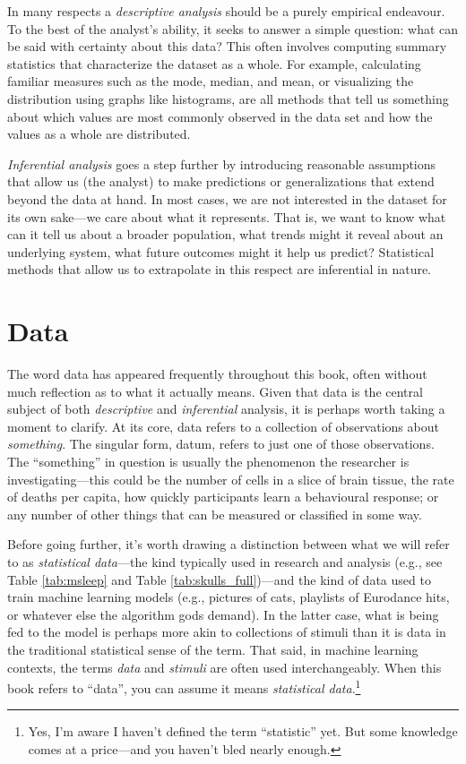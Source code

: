 In many respects a \textit{descriptive analysis} should be a purely empirical endeavour. To the best of the analyst’s ability, it seeks to answer a simple question: what can be said with certainty about this data? This often involves computing summary statistics that characterize the dataset as a whole. For example, calculating familiar measures such as the mode, median, and mean, or visualizing the distribution using graphs like histograms, are all methods that tell us something about which values are most commonly observed in the data set and how the values as a whole are distributed.

\textit{Inferential analysis} goes a step further by introducing reasonable assumptions that allow us (the analyst) to make predictions or generalizations that extend beyond the data at hand. In most cases, we are not interested in the dataset for its own sake—we care about what it represents. That is, we want to know what can it tell us about a broader population, what trends might it reveal about an underlying system, what future outcomes might it help us predict? Statistical methods that allow us to extrapolate in this respect are inferential in nature.

\section{Data}

The word data has appeared frequently throughout this book, often without much reflection as to what it actually means. Given that data is the central subject of both \textit{descriptive} and \textit{inferential} analysis, it is perhaps worth taking a moment to clarify. At its core, \gls{data} refers to a collection of observations about \textit{something}. The singular form, \gls{datum}, refers to just one of those observations. The ``something'' in question is usually the phenomenon the researcher is investigating—this could be the number of cells in a slice of brain tissue, the rate of deaths per capita, how quickly participants learn a behavioural response; or any number of other things that can be measured or classified in some way. 

Before going further, it’s worth drawing a distinction between what we will refer to as \textit{statistical data}—the kind typically used in research and analysis (e.g., see Table \ref{tab:msleep} and Table \ref{tab:skulls_full})—and the kind of data used to train machine learning models (e.g., pictures of cats, playlists of Eurodance hits, or whatever else the algorithm gods demand). In the latter case, what is being fed to the model is perhaps more akin to collections of stimuli than it is data in the traditional statistical sense of the term. That said, in machine learning contexts, the terms \textit{data} and \textit{stimuli} are often used interchangeably. When this book refers to ``data'', you can assume it means \textit{statistical data}.\footnote{Yes, I’m aware I haven’t defined the term ``statistic'' yet. But some knowledge comes at a price—and you haven’t bled nearly enough.}

